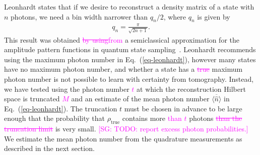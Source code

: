 \documentclass[
reprint,
superscriptaddress,
showpacs,
amsmath,
amssymb,
aps,
pra,
longbibliography
]{revtex4-1}
\providecommand{\aucmnt}[1]{#1}
\providecommand{\editcolor}[2]{\textcolor{#1}{#2}}
\providecommand{\aucmnt}[1]{}
\providecommand{\editcolor}[2]{#2}
\newcommand{\SG}[1]{\editcolor{magenta}{#1}}
\newcommand{\SGs}[1]{\aucmnt{\editcolor{magenta}{\sout{#1}}}}
\newcommand{\SGc}[1]{\aucmnt{\editcolor{magenta}{[SG: #1]}}}
\newcommand{\rhotrue}{\rho_{\text{true}}}
\begin{document}
Leonhardt states that if we desire to reconstruct a density matrix of
a state with $n$ photons, we need a bin width narrower than $q_n/2$,
where $q_n$ is given by
\begin{eqnarray}
  q_n = \frac{\pi}{\sqrt{2 n + 1}}.
  \label{eq-leonhardt}
\end{eqnarray}
This result was obtained \SGs{by using}\SG{from} a semiclassical
approximation for the amplitude pattern functions in quantum state
sampling~\cite{Leonhardt1996}. Leonhardt recommends using the maximum
photon number in Eq.~(\ref{eq-leonhardt}), however many states have no
maximum photon number, and whether a state has a \SGs{true }maximum
photon number is not possible to learn with certainty from tomography.
Instead, we have tested using the photon number \SG{$t$} at which the
reconstruction Hilbert space is truncated\SGs{ $M$} and an estimate of
the mean photon number $\overline{\langle \hat{n} \rangle}$ in
Eq.~(\ref{eq-leonhardt}).  The truncation $t$ must be chosen in
advance to be large enough that the probability that $\rhotrue$
contains more \SG{than $t$} photons \SGs{than the truncation limit} is
very small.  \SGc{TODO: report excess photon probabilities.}  We
estimate the mean photon number from the quadrature measurements as
described in the next section.
\end{document}
